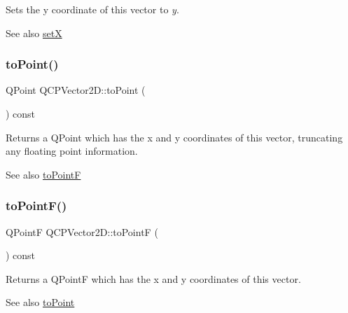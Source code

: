Sets the y coordinate of this vector to {\itshape y}.

\begin{DoxySeeAlso}{See also}
\hyperlink{class_q_c_p_vector2_d_ab4249e6ce7bfc37be56f014c54b761ae}{setX} 
\end{DoxySeeAlso}
\mbox{\label{class_q_c_p_vector2_d_add3edf75de9b7bf1abc693b973b2e906}} 
\subsubsection{\texorpdfstring{to\+Point()}{toPoint()}}
{\footnotesize\ttfamily Q\+Point Q\+C\+P\+Vector2\+D\+::to\+Point (\begin{DoxyParamCaption}{ }\end{DoxyParamCaption}) const\hspace{0.3cm}{\ttfamily [inline]}}

Returns a Q\+Point which has the x and y coordinates of this vector, truncating any floating point information.

\begin{DoxySeeAlso}{See also}
\hyperlink{class_q_c_p_vector2_d_acd7af3f4a62833ada58be3f3021dbbac}{to\+PointF} 
\end{DoxySeeAlso}
\mbox{\label{class_q_c_p_vector2_d_acd7af3f4a62833ada58be3f3021dbbac}} 
\subsubsection{\texorpdfstring{to\+Point\+F()}{toPointF()}}
{\footnotesize\ttfamily Q\+PointF Q\+C\+P\+Vector2\+D\+::to\+PointF (\begin{DoxyParamCaption}{ }\end{DoxyParamCaption}) const\hspace{0.3cm}{\ttfamily [inline]}}

Returns a Q\+PointF which has the x and y coordinates of this vector.

\begin{DoxySeeAlso}{See also}
\hyperlink{class_q_c_p_vector2_d_add3edf75de9b7bf1abc693b973b2e906}{to\+Point} 
\end{DoxySeeAlso}


